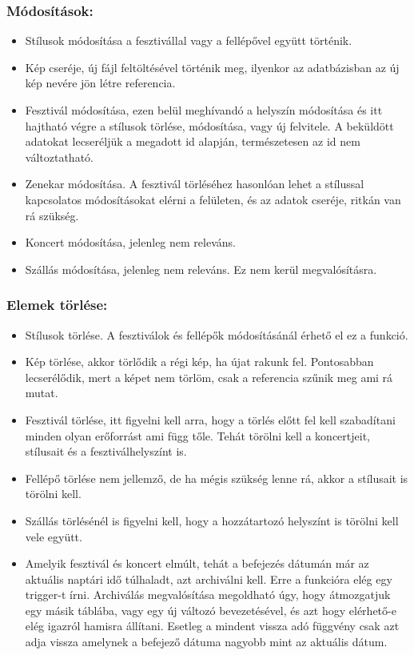 \subsubsection{Módosítások:}
\begin{itemize}

\item Stílusok módosítása a fesztivállal vagy a fellépővel együtt történik.

\item Kép cseréje, új fájl feltöltésével történik meg, ilyenkor az adatbázisban az új kép nevére jön létre referencia.

\item Fesztivál módosítása, ezen belül meghívandó a helyszín módosítása és itt hajtható végre a stílusok törlése, módosítása, vagy új felvitele. A beküldött adatokat lecseréljük a megadott id alapján, természetesen az id nem változtatható.

\item Zenekar módosítása. A fesztivál törléséhez hasonlóan lehet a stílussal  kapcsolatos módosításokat elérni a felületen, és az adatok cseréje, ritkán van rá szükség.

\item Koncert módosítása, jelenleg nem releváns. 
\item Szállás módosítása, jelenleg nem releváns. Ez nem kerül megvalósításra.
\end{itemize}

\subsubsection{Elemek törlése:}
\begin{itemize}
\item Stílusok törlése. A fesztiválok és fellépők módosításánál érhető el ez a funkció.

\item Kép törlése, akkor törlődik a régi kép, ha újat rakunk fel. Pontosabban lecserélődik, mert a képet nem törlöm, csak a referencia szűnik meg ami rá mutat.
\item Fesztivál törlése, itt figyelni kell arra, hogy a törlés előtt fel kell szabadítani minden olyan erőforrást ami függ tőle. Tehát törölni kell a koncertjeit, stílusait és a fesztiválhelyszínt is.
\item Fellépő törlése nem jellemző, de ha mégis szükség lenne rá, akkor a stílusait is törölni kell.
\item Szállás törlésénél is figyelni kell, hogy a hozzátartozó helyszínt is törölni kell vele együtt.
\item Amelyik fesztivál és koncert elmúlt, tehát a befejezés dátumán már az aktuális naptári idő  túlhaladt, azt archiválni kell. Erre a funkcióra elég egy trigger-t írni. Archiválás megvalósítása megoldható úgy, hogy átmozgatjuk egy másik táblába, vagy egy új változó bevezetésével, és azt hogy elérhető-e elég igazról hamisra állítani. Esetleg a mindent vissza adó függvény csak azt adja vissza amelynek a befejező dátuma nagyobb mint az aktuális dátum.
\end{itemize}

